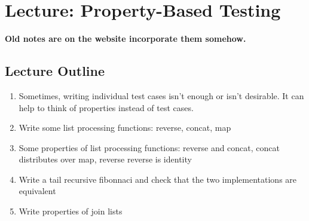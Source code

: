 \chapter{Lecture: Property-Based Testing}
\startlecture

\begin{instructor}

\textbf{Old notes are on the website incorporate them somehow.}

\section*{Lecture Outline}

\begin{enumerate}

\item  Sometimes, writing individual test cases isn't enough or isn't desirable.
It can help to think of properties instead of test cases.

\item Write some list processing functions: reverse, concat, map

\item Some properties of list processing functions: reverse and concat,
concat distributes over map, reverse reverse is identity

\item Write a tail recursive fibonnaci and check that the two implementations
are equivalent

\item Write properties of join lists

\end{enumerate}

\end{instructor}
